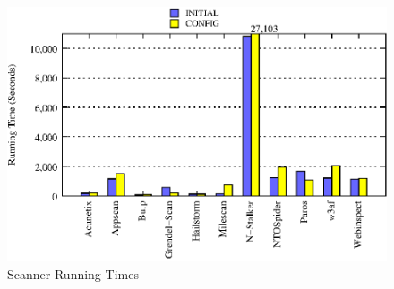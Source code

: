 \begin{figure}[tb]
      \includegraphics[scale=1]{running_time_graph}
      \caption{Scanner Running Times}
\end{figure}

